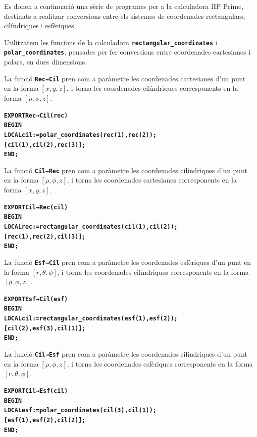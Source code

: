 \documentclass[catalan,a4paper,twoside,11pt]{article}
\begin{document}
Es donen a continuació una sèrie de programes per a la calculadora HP Prime, destinats a realitzar conversions entre els  sistemes de coordenades rectangulars, cilíndriques i esfèriques.

Utilitzarem les funcions de la calculadora \texttt{\textbf{rectangular\_coordinates}} i \texttt{\textbf{polar\_coordinates}}, pensades per fer conversions entre coordenades cartesianes i polars, en dues dimensions.

La funció \texttt{\textbf{Rec→Cil}} pren com a paràmetre les coordenades cartesianes d'un punt en la forma $[x,y,z]$, i torna les coordenades cilíndriques corresponents en la forma $[\rho,\phi,z]$.
\vspace{-6mm}
\begin{alltt}
\bfseries
    EXPORT Rec→Cil(rec)
    BEGIN
      LOCAL cil:=polar_coordinates(rec(1),rec(2));
      [cil(1),cil(2),rec(3)];
    END;
\end{alltt}

La funció \texttt{\textbf{Cil→Rec}} pren com a paràmetre les coordenades cilíndriques d'un punt en la forma $[\rho,\phi,z]$, i torna les coordenades cartesianes corresponents en la forma  $[x,y,z]$.
\vspace{-6mm}
\begin{alltt}
\bfseries
    EXPORT Cil→Rec(cil)
    BEGIN
      LOCAL rec:=rectangular_coordinates(cil(1),cil(2));
      [rec(1),rec(2),cil(3)];
    END;
\end{alltt}

La funció \texttt{\textbf{Esf→Cil}} pren com a paràmetre les coordenades esfèriques d'un punt en la forma $[r, \theta,\phi]$, i torna les coordenades cilíndriques corresponents en la forma  $[\rho,\phi,z]$.
\vspace{-6mm}
\begin{alltt}
\bfseries
    EXPORT Esf→Cil(esf)
    BEGIN
      LOCAL cil:=rectangular_coordinates(esf(1),esf(2));
      [cil(2),esf(3),cil(1)];
    END;
\end{alltt}

La funció \texttt{\textbf{Cil→Esf}} pren com a paràmetre les coordenades cilíndriques  d'un punt en la forma $[\rho,\phi,z]$, i torna les coordenades esfèriques corresponents en la forma $[r,\theta,\phi]$.
\vspace{-6mm}
\begin{alltt}
\bfseries
    EXPORT Cil→Esf(cil)
    BEGIN
      LOCAL esf:=polar_coordinates(cil(3),cil(1));
      [esf(1),esf(2),cil(2)];
    END;
\end{alltt}
\end{document}
